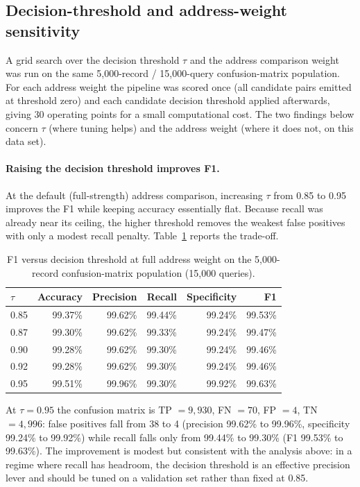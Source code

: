\documentclass[conference]{IEEEtran}
\begin{document}
\subsection{Decision-threshold and address-weight sensitivity}
A grid search over the decision threshold $\tau$ and the address comparison weight was run on the same 5{,}000-record / 15{,}000-query confusion-matrix population. For each address weight the pipeline was scored once (all candidate pairs emitted at threshold zero) and each candidate decision threshold applied afterwards, giving 30 operating points for a small computational cost. The two findings below concern $\tau$ (where tuning helps) and the address weight (where it does not, on this data set).

\paragraph{Raising the decision threshold improves F1.}
At the default (full-strength) address comparison, increasing $\tau$ from 0.85 to 0.95 improves the F1 while keeping accuracy essentially flat. Because recall was already near its ceiling, the higher threshold removes the weakest false positives with only a modest recall penalty. Table~\ref{tab:f1-threshold} reports the trade-off.

\begin{table}[t]
\centering
\caption{F1 versus decision threshold at full address weight on the 5{,}000-record confusion-matrix population (15{,}000 queries).}
\label{tab:f1-threshold}
\begin{tabular}{lrrrrr}
\toprule
$\tau$ & Accuracy & Precision & Recall & Specificity & F1 \\
\midrule
0.85 & 99.37\% & 99.62\% & 99.44\% & 99.24\% & 99.53\% \\
0.87 & 99.30\% & 99.62\% & 99.33\% & 99.24\% & 99.47\% \\
0.90 & 99.28\% & 99.62\% & 99.30\% & 99.24\% & 99.46\% \\
0.92 & 99.28\% & 99.62\% & 99.30\% & 99.24\% & 99.46\% \\
0.95 & 99.51\% & 99.96\% & 99.30\% & 99.92\% & 99.63\% \\
\bottomrule
\end{tabular}
\end{table}

At $\tau=0.95$ the confusion matrix is TP \(=9{,}930\), FN \(=70\), FP \(=4\), TN \(=4{,}996\): false positives fall from 38 to 4 (precision 99.62\% to 99.96\%, specificity 99.24\% to 99.92\%) while recall falls only from 99.44\% to 99.30\% (F1 99.53\% to 99.63\%). The improvement is modest but consistent with the analysis above: in a regime where recall has headroom, the decision threshold is an effective precision lever and should be tuned on a validation set rather than fixed at 0.85.
\end{document}
